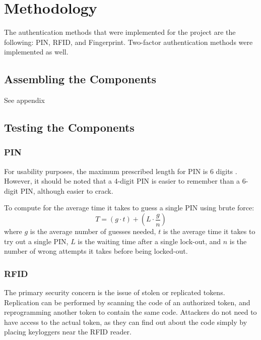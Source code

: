 \section{Methodology}

The authentication methods that were implemented for the project are the following: PIN, RFID, and Fingerprint. Two-factor authentication methods were implemented as well. 

\subsection{Assembling the Components}
See appendix

\subsection{Testing the Components}

\subsubsection{PIN}
For usability purposes, the maximum prescribed length for PIN is 6 digits \cite{ISO9564-1_2002}. However, it should be noted that a 4-digit PIN is easier to remember than a 6-digit PIN, although easier to crack.

To compute for the average time it takes to guess a single PIN using brute force: $$T = (g \cdot t) + (L \cdot \frac gn) $$ where $g$ is the average number of guesses needed, $t$ is the average time it takes to try out a single PIN, $L$ is the waiting time after a single lock-out, and $n$ is the number of wrong attempts it takes before being locked-out.

\subsubsection{RFID}
The primary security concern is the issue of stolen or replicated tokens. Replication can be performed by scanning the code of an authorized token, and reprogramming another token to contain the same code. Attackers do not need to have access to the actual token, as they can find out about the code simply by placing keyloggers near the RFID reader. %

